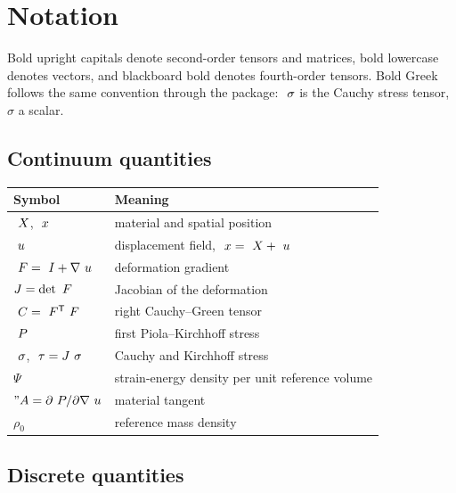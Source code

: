 \chapter{Notation}
\label{ch:notation}

Bold upright capitals denote second-order tensors and matrices, bold lowercase
denotes vectors, and blackboard bold denotes fourth-order tensors.  Bold Greek
follows the same convention through the  package: $~\sigma$
is the Cauchy stress tensor, $\sigma$ a scalar.

\section*{Continuum quantities}

\begin{tabular}{@{}ll@{}}
\toprule
Symbol & Meaning \\
\midrule
$~X$, $~x$        & material and spatial position \\
$~u$                       & displacement field, $~x = ~X + ~u$ \\
$~F = ~I + \nabla~u$ & deformation gradient \\
$J = \det~F$               & Jacobian of the deformation \\
$~C = ~F^{\mathsf{T}}~F$ & right Cauchy--Green tensor \\
$~P$                      & first Piola--Kirchhoff stress \\
$~\sigma$, $~\tau = J~\sigma$ & Cauchy and Kirchhoff stress \\
$\Psi$                        & strain-energy density per unit reference volume \\
$"A = \partial~P/\partial\nabla~u$ & material tangent \\
$\rho_0$                      & reference mass density \\
\bottomrule
\end{tabular}

\section*{Discrete quantities}

